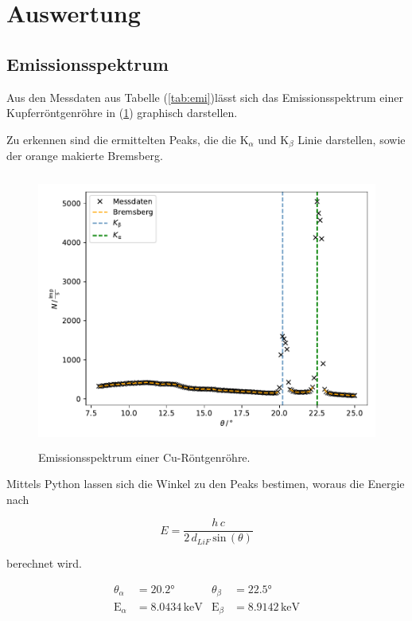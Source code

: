 \newpage
\section{Auswertung}
\subsection{Emissionsspektrum}
\label{sub:emi}
\noindent
Aus den Messdaten aus Tabelle (\ref{tab:emi})lässt sich das Emissionsspektrum einer Kupferröntgenröhre in (\ref{fig:emi}) graphisch darstellen.

\noindent
Zu erkennen sind die ermittelten Peaks, die die $\text{K}_\alpha$ und $\text{K}_\beta$ Linie darstellen, sowie der orange makierte Bremsberg.

\begin{figure}
    \centering
       \includegraphics[height=9cm]{daten/emissionsspektrum.pdf}
       \caption{Emissionsspektrum einer Cu-Röntgenröhre.}
       \label{fig:emi}
\end{figure}

\noindent
Mittels Python lassen sich die Winkel zu den Peaks bestimen, woraus die Energie nach

\begin{equation}
    E = \frac{h \, c}{2 \, d_{LiF} \, \text{sin}\, (\theta)}
\end{equation}

\noindent
berechnet wird.

\begin{align*}
    \theta_\alpha&=20.2° & \theta_\beta&=22.5° \\
    \text{E}_\alpha&=8.0434 \, \mathrm{keV}   &\text{E}_\beta&=8.9142 \, \mathrm{keV} \\
\end{align*}


